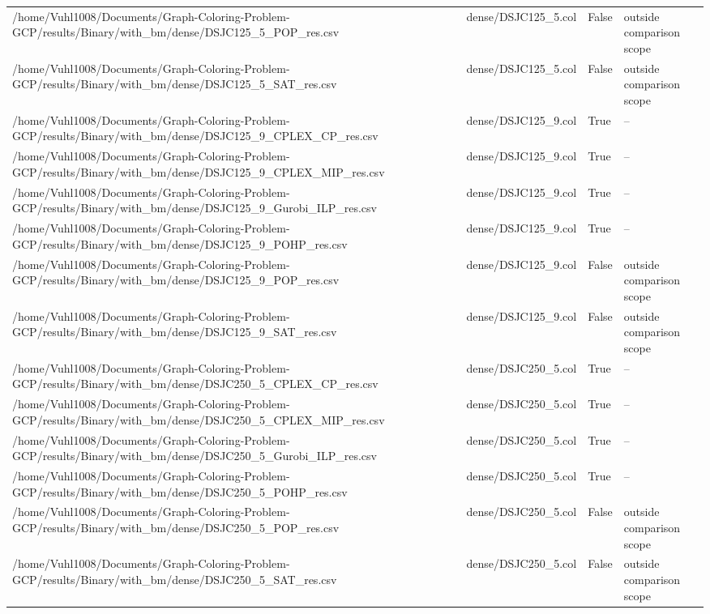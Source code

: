 \begin{table}[htbp]
\begin{tabular}{llll}
/home/Vuhl1008/Documents/Graph-Coloring-Problem-GCP/results/Binary/with\_bm/dense/DSJC125\_5\_POP\_res.csv & dense/DSJC125\_5.col & False & outside comparison scope \\
/home/Vuhl1008/Documents/Graph-Coloring-Problem-GCP/results/Binary/with\_bm/dense/DSJC125\_5\_SAT\_res.csv & dense/DSJC125\_5.col & False & outside comparison scope \\
/home/Vuhl1008/Documents/Graph-Coloring-Problem-GCP/results/Binary/with\_bm/dense/DSJC125\_9\_CPLEX\_CP\_res.csv & dense/DSJC125\_9.col & True & -- \\
/home/Vuhl1008/Documents/Graph-Coloring-Problem-GCP/results/Binary/with\_bm/dense/DSJC125\_9\_CPLEX\_MIP\_res.csv & dense/DSJC125\_9.col & True & -- \\
/home/Vuhl1008/Documents/Graph-Coloring-Problem-GCP/results/Binary/with\_bm/dense/DSJC125\_9\_Gurobi\_ILP\_res.csv & dense/DSJC125\_9.col & True & -- \\
/home/Vuhl1008/Documents/Graph-Coloring-Problem-GCP/results/Binary/with\_bm/dense/DSJC125\_9\_POHP\_res.csv & dense/DSJC125\_9.col & True & -- \\
/home/Vuhl1008/Documents/Graph-Coloring-Problem-GCP/results/Binary/with\_bm/dense/DSJC125\_9\_POP\_res.csv & dense/DSJC125\_9.col & False & outside comparison scope \\
/home/Vuhl1008/Documents/Graph-Coloring-Problem-GCP/results/Binary/with\_bm/dense/DSJC125\_9\_SAT\_res.csv & dense/DSJC125\_9.col & False & outside comparison scope \\
/home/Vuhl1008/Documents/Graph-Coloring-Problem-GCP/results/Binary/with\_bm/dense/DSJC250\_5\_CPLEX\_CP\_res.csv & dense/DSJC250\_5.col & True & -- \\
/home/Vuhl1008/Documents/Graph-Coloring-Problem-GCP/results/Binary/with\_bm/dense/DSJC250\_5\_CPLEX\_MIP\_res.csv & dense/DSJC250\_5.col & True & -- \\
/home/Vuhl1008/Documents/Graph-Coloring-Problem-GCP/results/Binary/with\_bm/dense/DSJC250\_5\_Gurobi\_ILP\_res.csv & dense/DSJC250\_5.col & True & -- \\
/home/Vuhl1008/Documents/Graph-Coloring-Problem-GCP/results/Binary/with\_bm/dense/DSJC250\_5\_POHP\_res.csv & dense/DSJC250\_5.col & True & -- \\
/home/Vuhl1008/Documents/Graph-Coloring-Problem-GCP/results/Binary/with\_bm/dense/DSJC250\_5\_POP\_res.csv & dense/DSJC250\_5.col & False & outside comparison scope \\
/home/Vuhl1008/Documents/Graph-Coloring-Problem-GCP/results/Binary/with\_bm/dense/DSJC250\_5\_SAT\_res.csv & dense/DSJC250\_5.col & False & outside comparison scope \\

\end{tabular}
\end{table}
